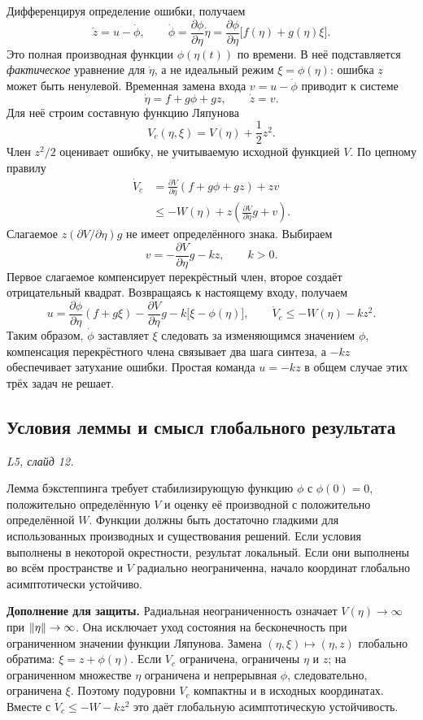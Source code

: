 Дифференцируя определение ошибки, получаем
\[
  \dot z=u-\dot\phi,\qquad
  \dot\phi=
  \frac{\partial\phi}{\partial\eta}\dot\eta
  =\frac{\partial\phi}{\partial\eta}
     \bigl[f(\eta)+g(\eta)\xi\bigr].
\]
Это полная производная функции $\phi(\eta(t))$ по времени.
В неё подставляется \emph{фактическое} уравнение для $\dot\eta$,
а не идеальный режим $\xi=\phi(\eta)$: ошибка $z$ может быть ненулевой.
Временная замена входа $v=u-\dot\phi$ приводит к системе
\[
  \dot\eta=f+g\phi+gz,\qquad \dot z=v.
\]
Для неё строим составную функцию Ляпунова
\[
  V_c(\eta,\xi)=V(\eta)+\frac12z^2.
\]
Член $z^2/2$ оценивает ошибку, не учитываемую исходной функцией $V$.
По цепному правилу
\begin{align*}
  \dot V_c
  &=\frac{\partial V}{\partial\eta}(f+g\phi+gz)+zv\\
  &\le -W(\eta)
       +z\left(\frac{\partial V}{\partial\eta}g+v\right).
\end{align*}
Слагаемое $z(\partial V/\partial\eta)g$ не имеет определённого знака.
Выбираем
\[
  v=-\frac{\partial V}{\partial\eta}g-kz,\qquad k>0.
\]
Первое слагаемое компенсирует перекрёстный член, второе создаёт
отрицательный квадрат. Возвращаясь к настоящему входу, получаем
\[
  \boxed{
  u=\frac{\partial\phi}{\partial\eta}(f+g\xi)
    -\frac{\partial V}{\partial\eta}g
    -k\bigl[\xi-\phi(\eta)\bigr]
  },\qquad
  \dot V_c\le -W(\eta)-kz^2.
\]
Таким образом, $\dot\phi$ заставляет $\xi$ следовать за изменяющимся
значением $\phi$, компенсация перекрёстного члена связывает два шага
синтеза, а $-kz$ обеспечивает затухание ошибки. Простая команда
$u=-kz$ в общем случае этих трёх задач не решает.

\subsection{Условия леммы и смысл глобального результата}
\textit{L5, слайд 12.}

Лемма бэкстеппинга требует стабилизирующую функцию $\phi$ с
$\phi(0)=0$, положительно определённую $V$ и оценку её производной
с положительно определённой $W$. Функции должны быть достаточно
гладкими для использованных производных и существования решений.
Если условия выполнены в некоторой окрестности, результат локальный.
Если они выполнены во всём пространстве и $V$ радиально неограниченна,
начало координат глобально асимптотически устойчиво.

\textbf{Дополнение для защиты.}
Радиальная неограниченность означает $V(\eta)\to\infty$ при
$\left\lVert\eta\right\rVert\to\infty$. Она исключает уход состояния на бесконечность
при ограниченном значении функции Ляпунова. Замена
$(\eta,\xi)\mapsto(\eta,z)$ глобально обратима:
$\xi=z+\phi(\eta)$. Если $V_c$ ограничена, ограничены $\eta$ и $z$;
на ограниченном множестве $\eta$ ограничена и непрерывная $\phi$,
следовательно, ограничена $\xi$. Поэтому подуровни $V_c$ компактны
и в исходных координатах. Вместе с
$\dot V_c\le-W-kz^2$ это даёт глобальную асимптотическую устойчивость.

